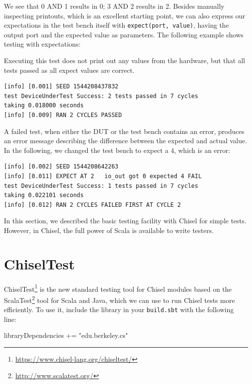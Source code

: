 \documentclass[%
    10pt,
    headinclude, footexclude,
    openright, %
    notitlepage,
    cleardoubleempty,
    headsepline,
    pointlessnumbers,
    bibtotoc, idxtotoc,
    ]{scrbook}
\newcommand{\code}[1]{{\small{\texttt{#1}}}}
\newcommand{\myref}[2]{\href{#1}{#2}}
\renewcommand{\myref}[2]{{#2}{\footnote{\url{#1}}}}
\begin{document}
\noindent We see that 0 AND 1 results in 0; 3 AND 2 results in 2.
Besides manually inspecting printouts, which is an excellent starting point, we can also
express our expectations in the test bench itself with \code{expect(port, value)},
having the output port and the expected value as parameters.
The following example shows testing with expectations:


\noindent Executing this test does not print out any values from the hardware,
but that all tests passed as all expect values are correct.

\begin{verbatim}
[info] [0.001] SEED 1544208437832
test DeviceUnderTest Success: 2 tests passed in 7 cycles
taking 0.018000 seconds
[info] [0.009] RAN 2 CYCLES PASSED
\end{verbatim}

\noindent A failed test, when either the DUT or the test bench contains an error,
produces an error message describing the difference between the expected and actual
value. In the following, we changed the test bench to expect a 4, which is an error:

\begin{verbatim}
[info] [0.002] SEED 1544208642263
[info] [0.011] EXPECT AT 2   io_out got 0 expected 4 FAIL
test DeviceUnderTest Success: 1 tests passed in 7 cycles
taking 0.022101 seconds
[info] [0.012] RAN 2 CYCLES FAILED FIRST AT CYCLE 2
\end{verbatim}

In this section, we described the basic testing facility with Chisel for simple tests.
However, in Chisel, the full power of Scala is available to write testers.

\section{ChiselTest}


\myref{https://www.chisel-lang.org/chiseltest/}{ChiselTest} is the new standard testing tool 
for Chisel modules based on the \myref{http://www.scalatest.org/}{ScalaTest} tool for Scala 
and Java, which we can use to run Chisel tests more efficiently.
To use it, include the library in your \code{build.sbt} with the following line:

\begin{chisel}
libraryDependencies += "edu.berkeley.cs" %
\end{chisel}
\end{document}
